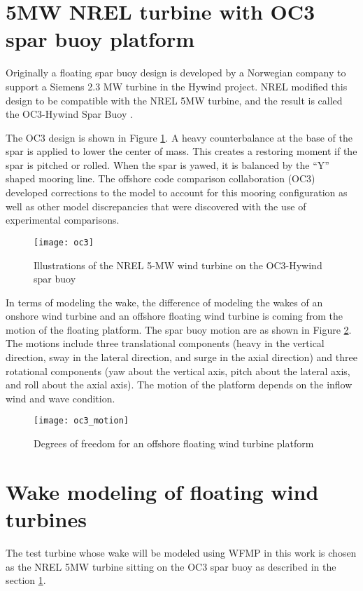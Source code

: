 \documentclass{umthesis}
\begin{document}
\section{5MW NREL turbine with OC3 spar buoy platform}\label{sec:spar}
Originally a floating spar buoy design is developed by a Norwegian company to support a Siemens 2.3 MW turbine in the Hywind project. NREL modified this design to be compatible with the NREL 5MW turbine, and the result is called the OC3-Hywind Spar Buoy \cite{oc3}.

The OC3 design is shown in Figure \ref{fig:oc3}. A heavy counterbalance at the base of the spar is applied to lower the center of mass. This creates a restoring moment if the spar is pitched or rolled. When the spar is yawed, it is balanced by the ``Y'' shaped mooring line. The offshore code comparison collaboration (OC3) developed corrections to the model to account for this mooring configuration as well as other model discrepancies that were discovered with the use of experimental comparisons.   

\begin{figure}
  \centering
  \texttt{[image: oc3]}
  \caption{Illustrations of the NREL 5-MW wind turbine on the OC3-Hywind spar buoy \cite{oc3}}\label{fig:oc3}
\end{figure}

In terms of modeling the wake, the difference of modeling the wakes of an onshore wind turbine and an offshore floating wind turbine is coming from the motion of the floating platform. The spar buoy motion are as shown in Figure \ref{fig:oc3_motion}. The motions include three translational components (heavy in the vertical direction, sway in the lateral direction, and surge in the axial direction) and three rotational components (yaw about the vertical axis, pitch about the lateral axis, and roll about the axial axis). The motion of the platform depends on the inflow wind and wave condition.

\begin{figure}
  \centering
  \texttt{[image: oc3\_motion]}
  \caption{Degrees of freedom for an offshore floating wind turbine platform \cite{Tran}}\label{fig:oc3_motion}
\end{figure}


\section{Wake modeling of floating wind turbines}
The test turbine whose wake will be modeled using WFMP in this work is chosen as the NREL 5MW turbine sitting on the OC3 spar buoy as described in the section \ref{sec:spar}.
\end{document}
